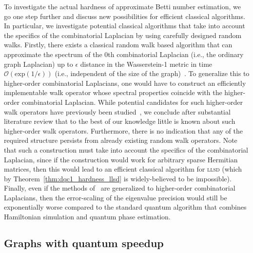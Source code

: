 \documentclass[a4paper, onecolumn, accepted=2022-08-28]{quantumarticle}
\newcommand{\bigO}[1]{\mathcal{O}\left( #1 \right)}
\begin{document}
To investigate the actual hardness of approximate Betti number estimation, we go one step further and discuss new possibilities for efficient classical algorithms. 
In particular, we investigate potential classical algorithms that take into account the specifics of the combinatorial Laplacian by using carefully designed random walks.
Firstly, there exists a classical random walk based algorithm that can approximate the spectrum of the $0$th combinatorial Laplacian (i.e., the ordinary graph Laplacian) up to $\epsilon$ distance in the Wasserstein-1 metric in time $\bigO{\mathrm{exp}(1/\epsilon)}$ (i.e., independent of the size of the graph)~\cite{cohen:walk}.
To generalize this to higher-order combinatorial Laplacians, one would have to construct an efficiently implementable walk operator whose spectral properties coincide with the higher-order combinatorial Laplacian.
While potential candidates for such higher-order walk operators have previously been studied~\cite{mukherjee:walk, parzanchevski:walk}, we conclude after substantial literature review that to the best of our knowledge little is known about such higher-order walk operators.
Furthermore, there is no indication that any of the required structure persists from already existing random walk operators.
Note that such a construction must take into account the specifics of the combinatorial Laplacian, since if the construction would work for arbitrary sparse Hermitian matrices, then this would lead to an efficient classical algorithm for \textsc{llsd} (which by Theorem~\ref{thm:dqc1_hardness_llsd} is widely-believed to be impossible).
Finally, even if the methods of~\cite{cohen:walk} are generalized to higher-order combinatorial Laplacians, then the error-scaling of the eigenvalue precision would still be exponentially worse compared to the standard quantum algorithm that combines Hamiltonian simulation and quantum phase estimation.


\subsection{Graphs with quantum speedup
\label{subsec:graphs_quantum_advantage}}
\end{document}

